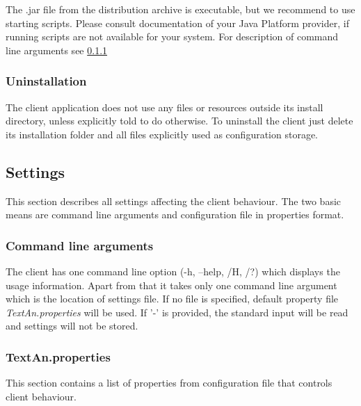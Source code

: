\documentclass[12pt,a4paper]{report}
\begin{document}
The .jar file from the distribution archive is executable,
but we recommend to use starting scripts.
Please consult documentation of your Java Platform provider,
if running scripts are not available for your system.
For description of command line arguments see \ref{ssec:CliCmdArg}

\subsubsection{Uninstallation}

The client application does not use any files or resources outside its install directory,
unless explicitly told to do otherwise.
To uninstall the client just delete its installation folder
and all files explicitly used as configuration storage.

\subsection{Settings}

This section describes all settings affecting the client behaviour.
The two basic means are command line arguments and configuration file in properties format.

\subsubsection{Command line arguments}
\label{ssec:CliCmdArg}

The client has one command line option (-h, --help, /H, /?) which displays the usage information.
Apart from that it takes only one command line argument which is the location of settings file.
If no file is specified, default property file \emph{TextAn.properties} will be used.
If '-' is provided, the standard input will be read and settings will not be stored.

\subsubsection{TextAn.properties}

This section contains a list of properties from configuration file that controls client behaviour.

\end{document}
